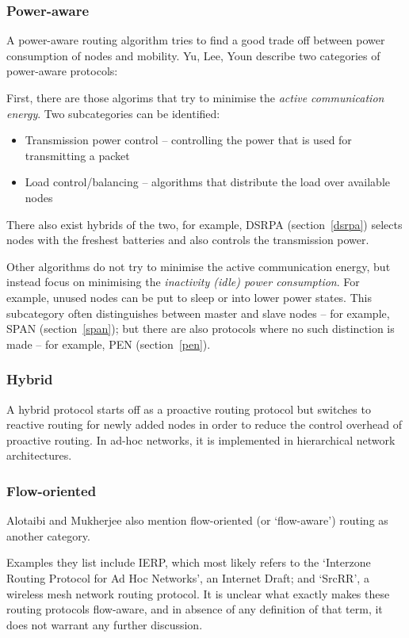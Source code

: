 \subsubsection*{Power-aware}
A power-aware routing algorithm tries to find a good trade off between
power consumption of nodes and mobility. Yu, Lee, Youn\cite{main1} describe two categories
of power-aware protocols:

First, there are those algorims that try to minimise the \textit{active communication energy}. Two
subcategories can be identified:
\begin{itemize}
    \item Transmission power control -- controlling the power that is used for transmitting a packet
    \item Load control/balancing -- algorithms that distribute the load over available nodes
\end{itemize}
There also exist hybrids of the two, for example, DSRPA (section~\ref{dsrpa})
selects nodes with the freshest batteries and also controls the transmission
power.

Other algorithms do not try to minimise the active communication energy, but
instead focus on minimising the  \textit{inactivity (idle) power consumption}. For example, unused
nodes can be put to sleep or into lower power states. This subcategory often
distinguishes between master and slave nodes -- for example, SPAN (section~\ref{span}); but there are also protocols
where no such distinction is made -- for example, PEN (section~\ref{pen}).

\subsubsection*{Hybrid}
A hybrid protocol starts off as a proactive routing protocol but switches
to reactive routing for newly added nodes in order to reduce the control
overhead of proactive routing. In ad-hoc networks, it is implemented in
hierarchical network architectures.

\subsubsection*{Flow-oriented}
Alotaibi and Mukherjee\cite{alotaibi2012survey} also mention flow-oriented (or `flow-aware')
routing as another category.

Examples they list include
IERP, which most likely refers to the `Interzone Routing Protocol for Ad Hoc Networks', an Internet Draft\cite{manet-zone-ierp-02};
and `SrcRR'\cite{aguayo2005srcrr}, a wireless mesh network routing protocol. It is unclear what exactly
makes these routing protocols flow-aware, and in absence of any definition of
that term, it does not warrant any further discussion. 

